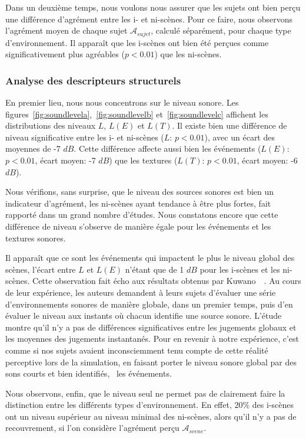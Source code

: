 \documentclass[twoside,twocolumn]{article}
\begin{document}
Dans un deuxième temps, nous voulons nous assurer que les sujets ont bien perçu une différence d'agrément entre les i- et ni-scènes. Pour ce faire, nous observons l'agrément moyen de chaque sujet $\mathcal{A}_{sujet}$, calculé séparément, pour chaque type d'environnement. Il apparaît que les i-scènes ont bien été perçues comme significativement plus agréables ($p<0.01$) que les ni-scènes.

\subsubsection*{Analyse des descripteurs structurels}

En premier lieu, nous nous concentrons sur le niveau sonore. Les figures~\ref{fig:soundlevela},~\ref{fig:soundlevelb} et~\ref{fig:soundlevelc} affichent les distributions des niveaux $L$, $L(E)$ et $L(T)$. Il existe bien une différence de niveau significative entre les i- et ni-scènes ($L$: $p<0.01$), avec un écart des moyennes de -7 $dB$. Cette différence affecte aussi bien les événements ($L(E)$: $p<0.01$, écart moyen: -7 $dB$) que les textures ($L(T)$: $p<0.01$, écart moyen: -6 $dB$).

Nous vérifions, sans surprise, que le niveau des sources sonores est bien un indicateur d'agrément, les ni-scènes ayant tendance à être plus fortes, fait rapporté dans un grand nombre d'études. Nous constatons encore que cette différence de niveau s'observe de manière égale pour les événements et les textures sonores.

Il apparaît que ce sont les événements qui impactent le plus le niveau global des scènes, l'écart entre $L$ et $L(E)$ n'étant que de 1 $dB$ pour les i-scènes et les ni-scènes. Cette observation fait écho aux résultats obtenus par Kuwano~\al~\cite{kuwano_memory_2003}. Au cours de leur expérience, les auteurs demandent à leurs sujets d'évaluer une série d'environnements sonores de manière globale, dans un premier temps, puis d'en évaluer le niveau aux instants où chacun identifie une source sonore. L'étude montre qu'il n'y a pas de différences significatives entre les jugements globaux et les moyennes des jugements instantanés. Pour en revenir à notre expérience, c'est comme si nos sujets avaient inconsciemment tenu compte de cette réalité perceptive lors de la simulation, en faisant porter le niveau sonore global par des sons courts et bien identifiés, \ie~les événements.


Nous observons, enfin, que le niveau seul ne permet pas de clairement faire la distinction entre les différents types d'environnement. En effet, $20\%$ des i-scènes ont un niveau supérieur au niveau minimal des ni-scènes, alors qu'il n'y a pas de recouvrement, si l'on considère l'agrément perçu $\mathcal{A}_{scene}$.
\end{document}
